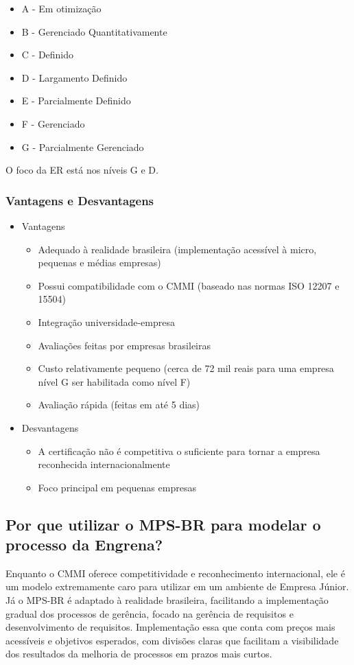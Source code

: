 \begin{itemize}
	\item A - Em otimização
	\item B - Gerenciado Quantitativamente
	\item C - Definido
	\item D - Largamento Definido
	\item E - Parcialmente Definido
	\item F - Gerenciado
	\item G - Parcialmente Gerenciado
\end{itemize}

O foco da ER está nos níveis G e D.

\subsubsection{Vantagens e Desvantagens}

\begin{itemize}
	\item Vantagens
		\begin{itemize}
			\item Adequado à realidade brasileira (implementação acessível à micro, pequenas e médias empresas)
			\item Possui compatibilidade com o CMMI (baseado nas normas ISO 12207 e 15504)
			\item Integração universidade-empresa
			\item Avaliações feitas por empresas brasileiras
			\item Custo relativamente pequeno (cerca de 72 mil reais para uma empresa nível G ser habilitada como nível F)
			\item Avaliação rápida (feitas em até 5 dias)
		\end{itemize}
	\item Desvantagens
		\begin{itemize}
			\item A certificação não é competitiva o suficiente para tornar a empresa reconhecida internacionalmente
			\item Foco principal em pequenas empresas
		\end{itemize}
\end{itemize}

\subsection{Por que utilizar o MPS-BR para modelar o processo da Engrena?}

Enquanto o CMMI oferece competitividade e reconhecimento internacional, ele é um modelo extremamente caro para utilizar em um ambiente de Empresa Júnior.
Já o MPS-BR é adaptado à realidade brasileira, facilitando a implementação gradual dos processos de gerência, focado na gerência de requisitos e desenvolvimento de requisitos. Implementação essa que conta com preços mais acessíveis e objetivos esperados, com divisões claras que facilitam a visibilidade dos resultados da melhoria de processos em prazos mais curtos.
